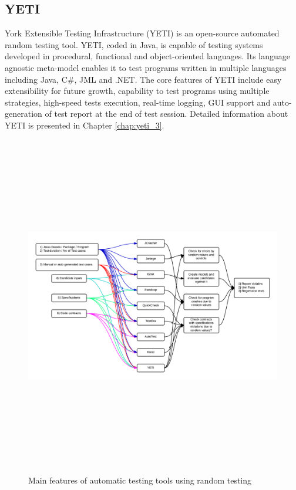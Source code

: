 
\subsection{YETI}
York Extensible Testing Infrastructure (YETI) is an open-source automated random testing tool. YETI, coded in Java, is capable of testing systems developed in procedural, functional and object-oriented languages. Its language agnostic meta-model enables it to test programs written in multiple languages including Java, C\#, JML and .NET. The core features of YETI include easy extensibility for future growth, capability to test programs using multiple strategies, high-speed tests execution, real-time logging, GUI support and auto-generation of test report at the end of test session. Detailed information about YETI is presented in Chapter \ref{chap:yeti_3}.


\begin{figure}
\centering
\centerline{\includegraphics[width=26cm, height=15cm]{chapter2/RandomTools01.png}}
	\caption{Main features of automatic testing tools using random testing}
	\label{fig:Tools}
\end{figure}

